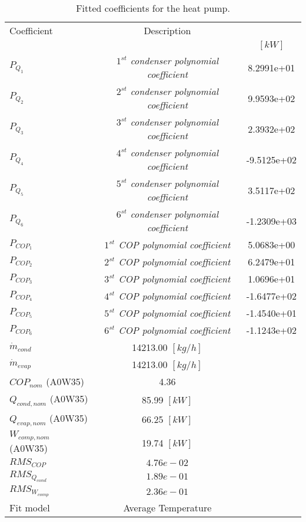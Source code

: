 \documentclass[english]{SPFShortReport}
\author{Dani Carbonell}
\begin{document}
\begin{table}[!ht]
\begin{small}
\caption{Fitted coefficients for the heat pump.}
\begin{center}
\resizebox{12cm}{!} 
{
\begin{tabular}{l | c c } 
\hline
\hline
Coefficient &Description & \\ 
 & &$[kW]$\\ 
\hline
$P_{Q_{1}}$ & \emph{$1^{st}$ condenser polynomial coefficient}  & 8.2991e+01    \\ 
$P_{Q_{2}}$ & \emph{$2^{st}$ condenser polynomial coefficient}  & 9.9593e+02    \\ 
$P_{Q_{3}}$ & \emph{$3^{st}$ condenser polynomial coefficient}  & 2.3932e+02    \\ 
$P_{Q_{4}}$ & \emph{$4^{st}$ condenser polynomial coefficient}  & -9.5125e+02    \\ 
$P_{Q_{5}}$ & \emph{$5^{st}$ condenser polynomial coefficient}  & 3.5117e+02    \\ 
$P_{Q_{6}}$ & \emph{$6^{st}$ condenser polynomial coefficient}  & -1.2309e+03    \\ 
\hline
$P_{COP_{1}}$ & \emph{$1^{st}$ COP polynomial coefficient}  & 5.0683e+00    \\ 
$P_{COP_{2}}$ & \emph{$2^{st}$ COP polynomial coefficient}  & 6.2479e+01    \\ 
$P_{COP_{3}}$ & \emph{$3^{st}$ COP polynomial coefficient}  & 1.0696e+01    \\ 
$P_{COP_{4}}$ & \emph{$4^{st}$ COP polynomial coefficient}  & -1.6477e+02    \\ 
$P_{COP_{5}}$ & \emph{$5^{st}$ COP polynomial coefficient}  & -1.4540e+01    \\ 
$P_{COP_{6}}$ & \emph{$6^{st}$ COP polynomial coefficient}  & -1.1243e+02    \\ 
\hline
$\dot m_{cond}$ & 14213.00 $[kg/h]$ \\ 
$\dot m_{evap}$ & 14213.00 $[kg/h]$ \\ 
\hline
$COP_{nom}$ (A0W35)& 4.36 \\ 
$Q_{cond,nom}$ (A0W35)& 85.99 $[kW]$\\ 
$Q_{evap,nom}$ (A0W35)& 66.25 $[kW]$\\ 
$W_{comp,nom}$ (A0W35)& 19.74 $[kW]$\\ 
\hline
 $RMS_{COP}$ & $4.76e-02$ \\ 
 $RMS_{Q_{cond}}$ & $1.89e-01$ \\ 
 $RMS_{W_{comp}}$ & $2.36e-01$ \\ 
\hline
Fit model & Average Temperature\\ 
\hline
\hline
\end{tabular}
}
\label{CoefTable}
\end{center}
\end{small}
\end{table}
\end{document}

